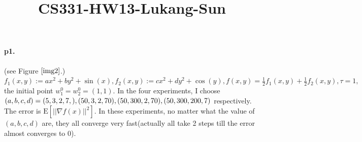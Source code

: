 \documentclass[12pt,a4paper]{article}
\title{CS331-HW13-Lukang-Sun}
\begin{document}
	\maketitle
	
	\paragraph{p1.}
	(see Figure $\ref{img2}$.)
	$f_1(x,y):=ax^2+by^2+\sin(x),f_2(x,y):=cx^2+dy^2+\cos(y), f(x,y)=\frac{1}{2}f_1(x,y)+\frac{1}{2}f_2(x,y), \tau = 1, $ the initial point $w_1^0=w^0_2=(1,1)$. In the four experiments, I choose $(a,b,c,d)=(5,3,2,7,),(50,3,2,70),\\(50,300,2,70),(50,300,200,7)$ respectively. The error is $\mathrm{E}\left[||\nabla f(x)||^2\right]$. In these experiments, no matter what the value of $(a,b,c,d)$ are, they all converge very fast(actually all take 2 steps till the error almost converges to 0).
\end{document}
